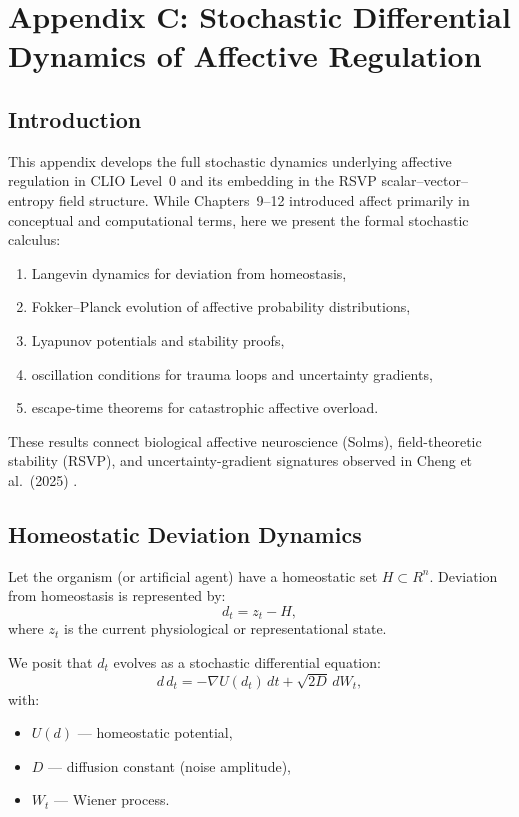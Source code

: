 \documentclass[12pt,oneside]{book}
\theoremstyle{plain}
\theoremstyle{definition}
\def\mathbb#1{#1}%
\begin{document}
\chapter{Appendix C: Stochastic Differential Dynamics of Affective Regulation}
\label{appendix:SDE}

\section{Introduction}

This appendix develops the full stochastic dynamics underlying affective
regulation in CLIO Level~0 and its embedding in the RSVP scalar--vector--entropy
field structure.
While Chapters~9--12 introduced affect primarily in conceptual and computational
terms, here we present the formal stochastic calculus:

\begin{enumerate}
    \item Langevin dynamics for deviation from homeostasis,
    \item Fokker--Planck evolution of affective probability distributions,
    \item Lyapunov potentials and stability proofs,
    \item oscillation conditions for trauma loops and uncertainty gradients,
    \item escape-time theorems for catastrophic affective overload.
\end{enumerate}

These results connect biological affective neuroscience (Solms),
field-theoretic stability (RSVP), and uncertainty-gradient signatures observed in
Cheng et al.\ (2025) \cite{Cheng2025CognitiveLV}.

\section{Homeostatic Deviation Dynamics}

Let the organism (or artificial agent) have a homeostatic set $H \subset \mathbb{R}^n$.
Deviation from homeostasis is represented by:
\begin{equation}
d_t = z_t - H,
\end{equation}
where $z_t$ is the current physiological or representational state.

We posit that $d_t$ evolves as a stochastic differential equation:
\begin{equation}
\label{eq:langevin-d}
d\,d_t
=
- \nabla U(d_t)\, dt
+ \sqrt{2D}\, dW_t,
\end{equation}
with:
\begin{itemize}
    \item $U(d)$ — homeostatic potential,
    \item $D$ — diffusion constant (noise amplitude),
    \item $W_t$ — Wiener process.
\end{itemize}
\end{document}
